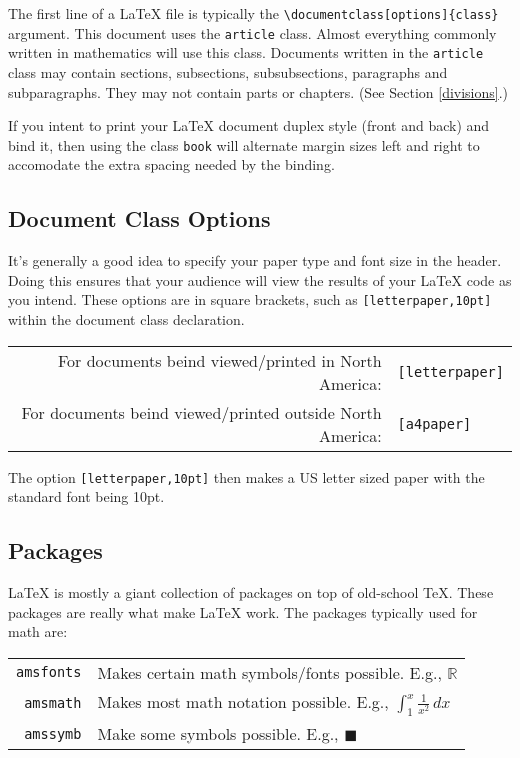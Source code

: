 \documentclass[letterpaper,twoside,10pt]{article}
\begin{document}
The first line of a {\LaTeX} file is typically the \verb!\documentclass[options]{class}! argument. This document uses the \texttt{article} class. Almost everything commonly written in mathematics will use this class. Documents written in the \texttt{article} class may contain sections, subsections, subsubsections, paragraphs and subparagraphs. They may not contain parts or chapters. (See Section \ref{divisions}.)

\bigbreak If you intent to print your {\LaTeX} document duplex style (front and back) and bind it, then using the class \texttt{book} will alternate margin sizes left and right to accomodate the extra spacing needed by the binding.

\subsection{Document Class Options}

It's generally a good idea to specify your paper type and font size in the header. Doing this ensures that your audience will view the results of your {\LaTeX} code as you intend. These options are in square brackets, such as \texttt{[letterpaper,10pt]} within the document class declaration.

\begin{center}
 \begin{tabular}{rl}
  \small For documents beind viewed/printed in North America: & \small\texttt{[letterpaper]}\\
  \small For documents beind viewed/printed outside North America: & \small\texttt{[a4paper]}
 \end{tabular}
\end{center}

The option \texttt{[letterpaper,10pt]} then makes a US letter sized paper with the standard font being 10pt.

\subsection{Packages}

{\LaTeX} is mostly a giant collection of packages on top of old-school {\TeX}. These packages are really what make {\LaTeX} work. The packages typically used for math are:

\begin{center}
 \begin{tabular}{rl}
  \small\texttt{amsfonts} & \small Makes certain math symbols/fonts possible. E.g., $\mathbb{R}$\\
  \small\texttt{amsmath} & \small Makes most math notation possible. E.g., $\displaystyle \int_1^x\frac{1}{x^2}\,dx$\\
  \small\texttt{amssymb} & \small Make some symbols possible. E.g., $\blacksquare$
 \end{tabular}
\end{center}
\end{document}
